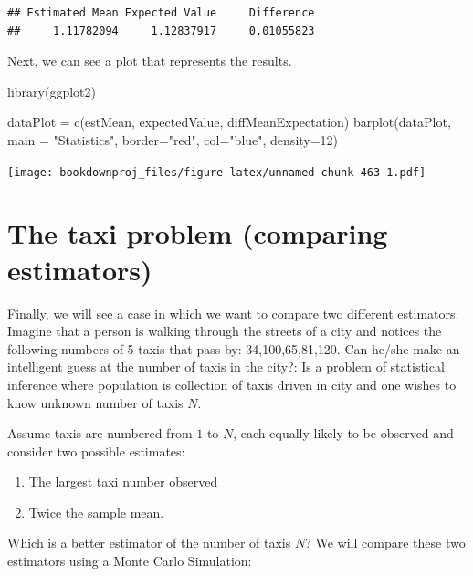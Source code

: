\documentclass[
]{book}
\newenvironment{Shaded}{\begin{snugshade}}{\end{snugshade}}
\newcommand{\AttributeTok}[1]{\textcolor[rgb]{0.77,0.63,0.00}{#1}}
\newcommand{\DecValTok}[1]{\textcolor[rgb]{0.00,0.00,0.81}{#1}}
\newcommand{\FunctionTok}[1]{\textcolor[rgb]{0.00,0.00,0.00}{#1}}
\newcommand{\NormalTok}[1]{#1}
\newcommand{\OtherTok}[1]{\textcolor[rgb]{0.56,0.35,0.01}{#1}}
\newcommand{\StringTok}[1]{\textcolor[rgb]{0.31,0.60,0.02}{#1}}
\providecommand{\tightlist}{%
  \setlength{\itemsep}{0pt}\setlength{\parskip}{0pt}}
\theoremstyle{definition}
\theoremstyle{definition}
\theoremstyle{definition}
\theoremstyle{definition}
\theoremstyle{remark}
\begin{document}
\begin{verbatim}
## Estimated Mean Expected Value     Difference 
##     1.11782094     1.12837917     0.01055823
\end{verbatim}

Next, we can see a plot that represents the results.

\begin{Shaded}
\begin{Highlighting}[]
\FunctionTok{library}\NormalTok{(ggplot2)}

\NormalTok{dataPlot }\OtherTok{=} \FunctionTok{c}\NormalTok{(estMean, expectedValue, diffMeanExpectation)}
\FunctionTok{barplot}\NormalTok{(dataPlot, }\AttributeTok{main =} \StringTok{"Statistics"}\NormalTok{, }\AttributeTok{border=}\StringTok{"red"}\NormalTok{, }\AttributeTok{col=}\StringTok{"blue"}\NormalTok{, }\AttributeTok{density=}\DecValTok{12}\NormalTok{)}
\end{Highlighting}
\end{Shaded}

\texttt{[image: bookdownproj\_files/figure-latex/unnamed-chunk-463-1.pdf]}

\hypertarget{the-taxi-problem-comparing-estimators}{%
\section{The taxi problem (comparing estimators)}\label{the-taxi-problem-comparing-estimators}}

Finally, we will see a case in which we want to compare two different estimators. Imagine that a person is walking through the streets of a city and notices the following numbers of 5 taxis that pass by: 34,100,65,81,120. Can he/she make an intelligent guess at the number of taxis in the city?: Is a problem of statistical inference where population is collection of taxis driven in city and one wishes to know unknown number of taxis \(N\).

Assume taxis are numbered from \(1\) to \(N\), each equally likely to be observed and consider two possible estimates:

\begin{enumerate}
\def\labelenumi{\arabic{enumi}.}
\tightlist
\item
  The largest taxi number observed
\item
  Twice the sample mean.
\end{enumerate}

Which is a better estimator of the number of taxis \(N\)? We will compare these two estimators using a Monte Carlo Simulation:
\end{document}
